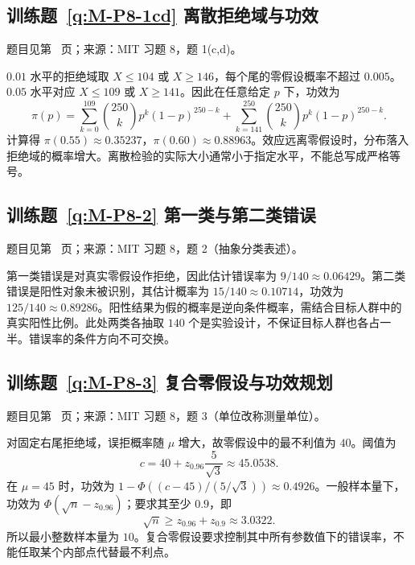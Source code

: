 \documentclass[UTF8,12pt,a4paper,fontset=fandol]{ctexbook}
\begin{document}
\subsection*{训练题~\ref{q:M-P8-1cd} 离散拒绝域与功效}\label{a:M-P8-1cd}{\small 题目见第~\pageref{q:M-P8-1cd} 页；来源：MIT 习题 8，题 1(c,d)。}
\begin{solve}$0.01$ 水平的拒绝域取 $X\le104$ 或 $X\ge146$，每个尾的零假设概率不超过 $0.005$。$0.05$ 水平对应 $X\le109$ 或 $X\ge141$。因此在任意给定 $p$ 下，功效为\[\pi(p)=\sum_{k=0}^{109}\binom{250}{k}p^k(1-p)^{250-k}+\sum_{k=141}^{250}\binom{250}{k}p^k(1-p)^{250-k}.\]计算得 $\pi(0.55)\approx0.35237$，$\pi(0.60)\approx0.88963$。效应远离零假设时，分布落入拒绝域的概率增大。离散检验的实际大小通常小于指定水平，不能总写成严格等号。\end{solve}

\subsection*{训练题~\ref{q:M-P8-2} 第一类与第二类错误}\label{a:M-P8-2}{\small 题目见第~\pageref{q:M-P8-2} 页；来源：MIT 习题 8，题 2（抽象分类表述）。}
\begin{solve}第一类错误是对真实零假设作拒绝，因此估计错误率为 $9/140\approx0.06429$。第二类错误是阳性对象未被识别，其估计概率为 $15/140\approx0.10714$，功效为 $125/140\approx0.89286$。阳性结果为假的概率是逆向条件概率，需结合目标人群中的真实阳性比例。此处两类各抽取 $140$ 个是实验设计，不保证目标人群也各占一半。错误率的条件方向不可交换。\end{solve}

\subsection*{训练题~\ref{q:M-P8-3} 复合零假设与功效规划}\label{a:M-P8-3}{\small 题目见第~\pageref{q:M-P8-3} 页；来源：MIT 习题 8，题 3（单位改称测量单位）。}
\begin{solve}对固定右尾拒绝域，误拒概率随 $\mu$ 增大，故零假设中的最不利值为 $40$。阈值为\[c=40+z_{0.96}\frac5{\sqrt3}\approx45.0538.\]在 $\mu=45$ 时，功效为 $1-\Phi((c-45)/(5/\sqrt3))\approx0.4926$。一般样本量下，功效为 $\Phi(\sqrt n-z_{0.96})$；要求其至少 $0.9$，即\[\sqrt n\ge z_{0.96}+z_{0.9}\approx3.0322.\]所以最小整数样本量为 $10$。复合零假设要求控制其中所有参数值下的错误率，不能任取某个内部点代替最不利点。\end{solve}
\end{document}
